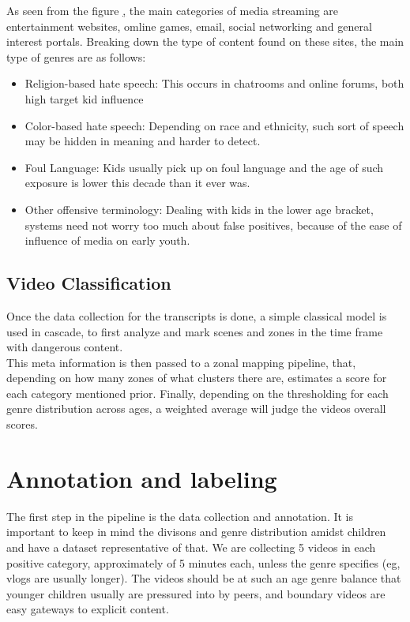 \documentclass{article}
\begin{document}
As seen from the figure \href{fig:genre_dist}, the main categories of media streaming are entertainment
websites, omline games, email, social networking and general interest portals. Breaking down the type of content
found on these sites, the main type of genres are as follows: \\
\begin{itemize}
    \item{Religion-based hate speech: This occurs in chatrooms and online forums, both high target kid influence}
    \item{Color-based hate speech: Depending on race and ethnicity, such sort of speech may be hidden in meaning and
    harder to detect.}
    \item{Foul Language: Kids usually pick up on foul language and the age of such exposure is lower this decade
    than it ever was.}
    \item{Other offensive terminology: Dealing with kids in the lower age bracket, systems need not worry too much about false positives,
    because of the ease of influence of media on early youth.}
\end{itemize}


\subsection{Video Classification}

Once the data collection for the transcripts is done, a simple classical model is used in cascade, to first analyze
and mark scenes and zones in the time frame with dangerous content.\\

This meta information is then passed to a zonal mapping pipeline, that, depending on how many zones of what clusters there are,
estimates a score for each category mentioned prior. Finally, depending on the thresholding for each genre distribution across ages,
a weighted average will judge the videos overall scores.

\section{Annotation and labeling}

The first step in the pipeline is the data collection and annotation. It is important to keep in mind the divisons
and genre distribution amidst children and have a dataset representative of that. We are collecting 5 videos in each positive category,
approximately of 5 minutes each, unless the genre specifies (eg, vlogs are usually longer). The videos should be at such an age genre balance
that younger children usually are pressured into by peers, and boundary videos are easy gateways to explicit content. \\
\end{document}
